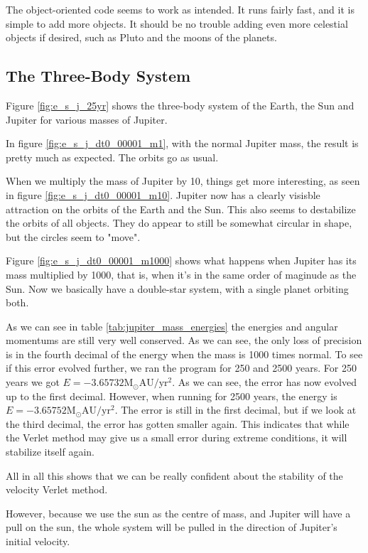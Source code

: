 \documentclass[10pt,showpacs,preprintnumbers,footinbib,amsmath,amssymb,aps,prl,twocolumn,groupedaddress,superscriptaddress,showkeys]{revtex4-1}
\begin{document}
The object-oriented code seems to work as intended. It runs fairly fast, and it is simple to add more objects. It should be no trouble adding even more celestial objects if desired, such as Pluto and the moons of the planets.

\subsection{The Three-Body System}

Figure \ref{fig:e_s_j_25yr} shows the three-body system of the Earth, the Sun and Jupiter for various masses of Jupiter.

In figure \ref{fig:e_s_j_dt0_00001_m1}, with the normal Jupiter mass, the result is pretty much as expected. The orbits go as usual.

When we multiply the mass of Jupiter by 10, things get more interesting, as seen in figure \ref{fig:e_s_j_dt0_00001_m10}. Jupiter now has a clearly visisble attraction on the orbits of the Earth and the Sun. This also seems to destabilize the orbits of all objects. They do appear to still be somewhat circular in shape, but the circles seem to "move".

Figure \ref{fig:e_s_j_dt0_00001_m1000} shows what happens when Jupiter has its mass multiplied by 1000, that is, when it's in the same order of maginude as the Sun. Now we basically have a double-star system, with a single planet orbiting both.

As we can see in table \ref{tab:jupiter_mass_energies} the energies and angular momentums are still very well conserved. As we can see, the only loss of precision is in the fourth decimal of the energy when the mass is 1000 times normal. To see if this error evolved further, we ran the program for 250 and 2500 years. For 250 years we got $E = -3.65732 \mathrm{M_\odot AU/yr^2}$. As we can see, the error has now evolved up to the first decimal. However, when running for 2500 years, the energy is $E = -3.65752 \mathrm{M_\odot AU/yr^2}$. The error is still in the first decimal, but if we look at the third decimal, the error has gotten smaller again. This indicates that while the Verlet method may give us a small error during extreme conditions, it will stabilize itself again.

All in all this shows that we can be really confident about the stability of the velocity Verlet method.

However, because we use the sun as the centre of mass, and Jupiter will have a pull on the sun, the whole system will be pulled in the direction of Jupiter's initial velocity.
\end{document}
